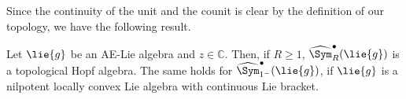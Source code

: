 Since the continuity of the unit and the counit is clear by the definition of 
our topology, we have the following result.
\begin{proposition}
    \label{Prop:Hopf:ContinuousHopf}%
    Let $\lie{g}$ be an AE-Lie algebra and $z \in \mathbb{C}$. Then, 
    if $R \geq 1$, $\widehat{\Sym}_R^\bullet (\lie{g})$ is a topological Hopf 
    algebra. The same holds for $\widehat{\Sym}_{1^-}^{\bullet}(\lie{g})$,
    if $\lie{g}$ is a nilpotent locally convex Lie algebra with continuous
    Lie bracket.
\end{proposition}
